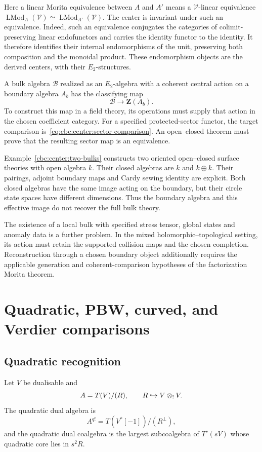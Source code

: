 Here a linear Morita equivalence between $A$ and $A'$ means a $\mathcal V$-linear equivalence $\operatorname{LMod}_A(\mathcal V)\simeq\operatorname{LMod}_{A'}(\mathcal V)$.
The center is invariant under such an equivalence.
Indeed, such an equivalence conjugates the categories of colimit-preserving linear endofunctors and carries the identity functor to the identity.
It therefore identifies their internal endomorphisms of the unit, preserving both composition and the monoidal product.
These endomorphism objects are the derived centers, with their $E_2$-structures.

A bulk algebra $\mathcal B$ realized as an $E_2$-algebra with a coherent central action on a boundary algebra $A_b$ has the classifying map
\[
 \mathcal B\longrightarrow\mathbf Z(A_b).
\]
To construct this map in a field theory, its operations must supply that action in the chosen coefficient category.
For a specified protected-sector functor, the target comparison is~\eqref{eq:cbc:center:sector-comparison}.
An open--closed theorem must prove that the resulting sector map is an equivalence.

\begin{nogobox}[title={No-go theorem 10: boundary data and surface bulks}]
Example~\ref{cbc:center:two-bulks} constructs two oriented open--closed surface theories with open algebra $k$.
Their closed algebras are $k$ and $k\oplus k$.
Their pairings, adjoint boundary maps and Cardy sewing identity are explicit.
Both closed algebras have the same image acting on the boundary, but their circle state spaces have different dimensions.
Thus the boundary algebra and this effective image do not recover the full bulk theory.
\end{nogobox}

The existence of a local bulk with specified stress tensor, global states and anomaly data is a further problem.
In the mixed holomorphic--topological setting, its action must retain the supported collision maps and the chosen completion.
Reconstruction through a chosen boundary object additionally requires the applicable generation and coherent-comparison hypotheses of the factorization Morita theorem.

\chapter{Quadratic, PBW, curved, and Verdier comparisons}\label{chap:quadratic}

\section{Quadratic recognition}
Let \(V\) be dualisable and
\[
 A=T(V)/(R),\qquad R\hookrightarrow V\mathbin{\otimes_{!}} V.
\]
The quadratic dual algebra is
\[
 A^{q!}=T(V^*[-1])/(R^\perp),
\]
and the quadratic dual coalgebra is the largest subcoalgebra of \(T^c(sV)\) whose quadratic core lies in \(s^2R\).

